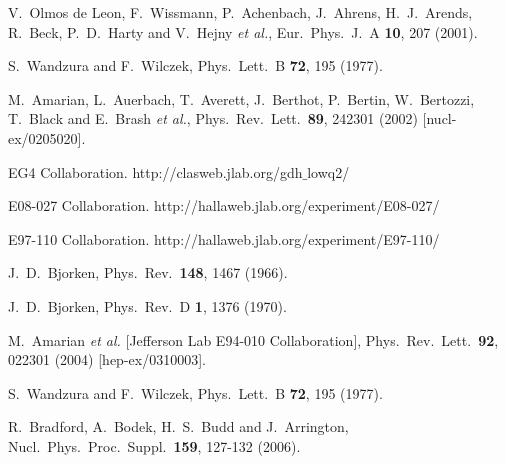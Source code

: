 \documentclass[twocolumn,prc,showpacs,nofootinbib,preprintnumbers,amsmath,amssymb,superscriptaddress]{revtex4-1}
\begin{document}
\begin{thebibliography}{99}
V.~Olmos de Leon, F.~Wissmann, P.~Achenbach, J.~Ahrens, H.~J.~Arends, R.~Beck, P.~D.~Harty and V.~Hejny {\it et al.}, 
Eur.\ Phys.\ J.\ A {\bf 10}, 207 (2001). 


  S.~Wandzura and F.~Wilczek,
  Phys.\ Lett.\ B {\bf 72}, 195 (1977).
  
  M.~Amarian, L.~Auerbach, T.~Averett, J.~Berthot, P.~Bertin, W.~Bertozzi, T.~Black and E.~Brash {\it et al.},
  Phys.\ Rev.\ Lett.\  {\bf 89}, 242301 (2002)
  [nucl-ex/0205020].
  
EG4 Collaboration. http://clasweb.jlab.org/gdh$\_$lowq2/

E08-027 Collaboration. http://hallaweb.jlab.org/experiment/E08-027/

E97-110 Collaboration. http://hallaweb.jlab.org/experiment/E97-110/

  J.~D.~Bjorken,
  Phys.\ Rev.\  {\bf 148}, 1467 (1966).
  
  J.~D.~Bjorken,
  Phys.\ Rev.\ D {\bf 1}, 1376 (1970).
  
  M.~Amarian {\it et al.}  [Jefferson Lab E94-010 Collaboration],
  Phys.\ Rev.\ Lett.\  {\bf 92}, 022301 (2004)
  [hep-ex/0310003].

  S.~Wandzura and F.~Wilczek,
  Phys.\ Lett.\ B {\bf 72}, 195 (1977).

R.~Bradford, A.~Bodek, H.~S.~Budd and J.~Arrington, Nucl.\ Phys.\ Proc.\ Suppl.\ {\bf 159}, 127-132 (2006).




\end{thebibliography}
\end{document}
